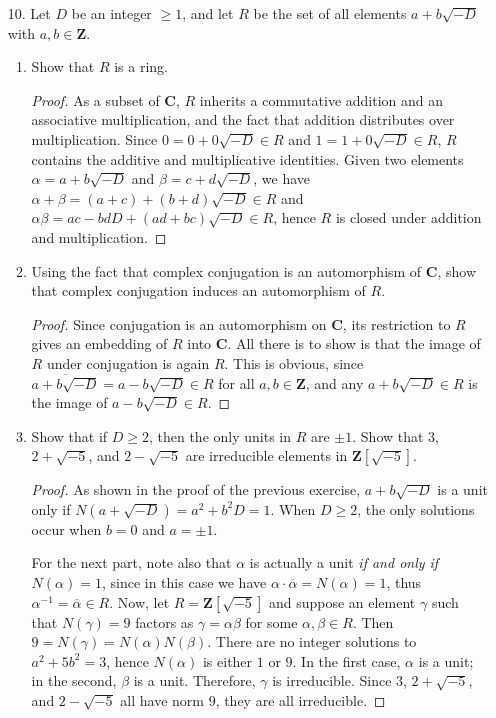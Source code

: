 \documentclass[10pt]{article}
\newcommand{\Z}{\mathbf{Z}}
\newcommand{\C}{\mathbf{C}}
\renewcommand{\bar}{\overline}
\begin{document}
\begin{enumerate}
\item[10.] Let $D$ be an integer $\geq 1$, and let $R$ be the set of all elements $a+b\sqrt{-D}$ with $a,b \in \Z$.
\begin{enumerate}
\item Show that $R$ is a ring.

\begin{proof}
As a subset of $\C$, $R$ inherits a commutative addition and an associative multiplication, and the fact that addition distributes over multiplication.  Since $0 = 0 + 0\sqrt{-D} \in R$ and $1 = 1+0\sqrt{-D} \in R$, $R$ contains the additive and multiplicative identities.  Given two elements $\alpha = a + b \sqrt{-D}$ and $\beta = c + d \sqrt{-D}$, we have $\alpha + \beta = (a+c) + (b+d)\sqrt{-D} \in R$ and $\alpha \beta = ac - bdD + (ad + bc)\sqrt{-D} \in R$, hence $R$ is closed under addition and multiplication.
\end{proof}

\item Using the fact that complex conjugation is an automorphism of $\C$, show that complex conjugation induces an automorphism of $R$.

\begin{proof}
Since conjugation is an automorphism on $\C$, its restriction to $R$ gives an embedding of $R$ into $\C$.  All there is to show is that the image of $R$ under conjugation is again $R$.  This is obvious, since $\bar{a+b\sqrt{-D}} = a-b\sqrt{-D} \in R$ for all $a,b \in \Z$, and any $a + b\sqrt{-D} \in R$ is the image of $a - b\sqrt{-D} \in R$.
\end{proof}

\item Show that if $D \geq 2$, then the only units in $R$ are $\pm 1$.  Show that $3$, $2 + \sqrt{-5}$, and $2 - \sqrt{-5}$ are irreducible elements in $\Z[\sqrt{-5}]$.

\begin{proof}
As shown in the proof of the previous exercise, $a+b\sqrt{-D}$ is a unit only if $N(a+\sqrt{-D}) = a^2 + b^2D = 1$.  When $D \geq 2$, the only solutions occur when $b = 0$ and $a = \pm 1$.

For the next part, note also that $\alpha$ is actually a unit \emph{if and only if} $N(\alpha) = 1$, since in this case we have $\alpha \cdot \bar{\alpha} = N(\alpha) = 1$, thus $\alpha^{-1} = \bar{\alpha} \in R$.  Now, let $R = \Z[\sqrt{-5}]$ and suppose an element $\gamma$ such that $N(\gamma) = 9$ factors as $\gamma = \alpha \beta$ for some $\alpha, \beta \in R$.  Then $9 = N(\gamma) = N(\alpha)N(\beta)$.  There are no integer solutions to $a^2 + 5b^2 = 3$, hence $N(\alpha)$ is either $1$ or $9$.  In the first case, $\alpha$ is a unit; in the second, $\beta$ is a unit.  Therefore, $\gamma$ is irreducible.  Since $3$, $2+\sqrt{-5}$, and $2 - \sqrt{-5}$ all have norm $9$, they are all irreducible.
\end{proof}


\end{enumerate}
\end{enumerate}
\end{document}
